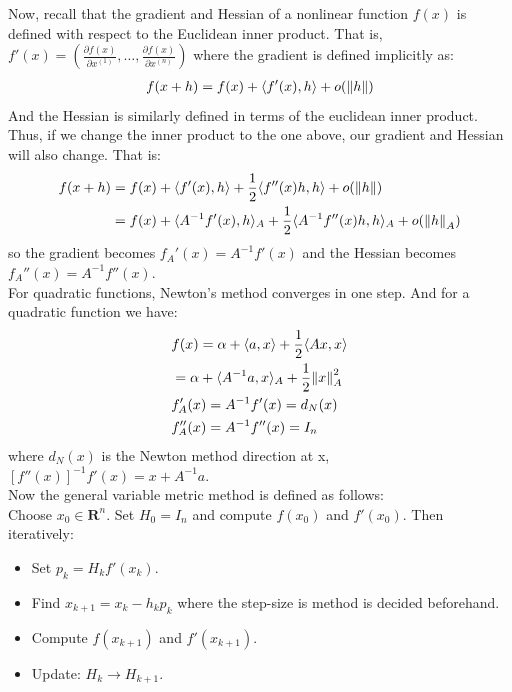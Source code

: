 \documentclass[12pt,a4paper]{article}
\begin{document}
	Now, recall that the gradient and Hessian of a nonlinear function $f(x)$ is defined with respect to the Euclidean inner product. That is, $f'(x) = (\frac{\partial f(x)}{\partial x^{(1)}}, \ldots , \frac{\partial f(x)}{\partial x^{(n)}})$ where the gradient is defined implicitly as:
	\begin{align*}
		f(x+h) = f(x) + \langle f'(x), h \rangle + o(\norm{h})
	\end{align*}
	And the Hessian is similarly defined in terms of the euclidean inner product. Thus, if we change the inner product to the one above, our gradient and Hessian will also change. That is:
	\begin{align*}
		f(x+h) &= f(x) + \langle f'(x), h \rangle + \frac{1}{2} \langle f''(x)h, h \rangle + o(\norm{h}) \\
		&= f(x) + \langle A^{-1}f'(x), h \rangle_A + \frac{1}{2}\langle A^{-1}f''(x)h,h \rangle_A + o(\norm{h}_A)
	\end{align*}
	so the gradient becomes $f_A'(x) = A^{-1}f'(x)$ and the Hessian becomes $f_A''(x) = A^{-1}f''(x)$.\\
	For quadratic functions, Newton's method converges in one step. And for a quadratic function we have:
	\begin{align*}
		&f(x) = \alpha + \langle a, x \rangle + \frac{1}{2} \langle A x, x \rangle \\
		&= \alpha + \langle A^{-1}a, x \rangle_A + \frac{1}{2}\norm{x}_A^2 \\
		&f'_A(x) =  A^{-1}f'(x) = d_N(x) \\
		&f''_A(x) = A^{-1}f''(x) = I_n
	\end{align*}
	where $d_N(x)$ is the Newton method direction at x, $[f''(x)]^{-1}f'(x) = x + A^{-1}a$. \\
	Now the general variable metric method is defined as follows:\\
	Choose $x_0 \in \mathbf{R}^n$. Set $H_0 = I_n$ and compute $f(x_0)$ and $f'(x_0)$. Then iteratively:
	\begin{itemize}
		\item Set $p_k = H_kf'(x_k)$.
		\item Find $x_{k+1} = x_k - h_kp_k$ where the step-size is method is decided beforehand.
		\item Compute $f(x_{k+1})$ and $f'(x_{k+1})$.
		\item Update: $H_k \rightarrow H_{k+1}$.
	\end{itemize}
	
\end{document}
